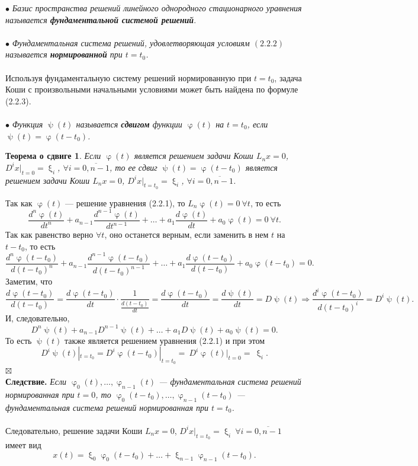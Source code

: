 \documentclass[a4paper, 12pt]{report}
\newenvironment{Proof} %
{\par\noindent{$\blacklozenge$}} %
{\hfill$\scriptstyle\boxtimes$}
\renewcommand{\varphi}{\upvarphi}
\renewcommand{\psi}{\uppsi}
\renewcommand{\xi}{\upxi}
\begin{document}
	$\bullet$ \textit{Базис пространства решений линейного однородного стационарного уравнения называется \textbf{фундаментальной системой решений}}.\\\\
	$\bullet$ \textit{Фундаментальная система решений, удовлетворяющая условиям $(2.2.2)$ называется \textbf{нормированной} при $t = t_0$.}\\\\
	Используя фундаментальную систему решений нормированную при $t=t_0$, задача Коши с произвольными начальными условиями может быть найдена по формуле (2.2.3).\\\\
	$\bullet$ \textit{Функция $\psi(t)$ называется \textbf{сдвигом} функции $\varphi(t)$ на $t=t_0$, если $\psi(t) = \varphi(t-t_0)$.}
	\newtheorem*{2_2_4}{Теорема о сдвиге}\begin{2_2_4}
		Если $\varphi(t)$ является решением задачи Коши $L_nx = 0$, $D^ix|_{t=0} = \xi_i$, $\forall i = \overline{0,n-1}$, то ее сдвиг $\psi(t) = \varphi(t-t_0)$ является решением задачи Коши  $L_nx = 0$, $D^ix|_{t=t_0} = \xi_i$, $\forall i = \overline{0,n-1}$.
	\end{2_2_4}\begin{Proof}
		Так как $\varphi(t)$ --- решение уравнения (2.2.1), то $L_n\varphi(t) = 0\ \forall t$, то есть $$\dfrac{d^n\varphi(t)}{dt^n}+a_{n-1}\dfrac{d^{n-1}\varphi(t)}{dt^{n-1}} + \ldots + a_1\dfrac{d\varphi(t)}{dt} + a_0 \varphi(t) = 0\ \forall t.$$
		Так как равенство верно $\forall t$, оно останется верным, если заменить в нем $t$ на $t-t_0$, то есть
		$$\dfrac{d^n\varphi(t-t_0)}{d(t-t_0)^n}+a_{n-1}\dfrac{d^{n-1}\varphi(t-t_0)}{d(t-t_0)^{n-1}} + \ldots + a_1\dfrac{d\varphi(t-t_0)}{d(t-t_0)} + a_0 \varphi(t-t_0) = 0.$$ Заметим, что $$\dfrac{d\varphi(t-t_0)}{d(t-t_0)} = \dfrac{d\varphi(t-t_0)}{dt} \cdot \dfrac{1}{\frac{d(t-t_0)}{dt}} = \dfrac{d\varphi(t-t_0)}{dt} = \dfrac{d\psi(t)}{dt} = D\psi(t)\Rightarrow\dfrac{d^i\varphi(t-t_0)}{d(t-t_0)^i} = D^i\psi(t).$$ И, следовательно, $$D^n\psi(t) + a_{n-1}D^{n-1}\psi(t) + \ldots + a_1D\psi(t) + a_0\psi(t) = 0.$$ То есть $\psi(t)$ также является решением уравнения (2.2.1) и при этом $$D^i\psi(t)|_{t=t_0} = D^i\varphi(t-t_0)|_{t=t_0} =~D^i\varphi(t)|_{t=0} =~\xi_i.$$\end{Proof}\\
	\textbf{Следствие.} \textit{Если $\varphi_0(t),\ldots,\varphi_{n-1}(t)$ --- фундаментальная система решений нормированная при $t=0$, то $\varphi_0(t-t_0),\ldots,\varphi_{n-1}(t-t_0)$ --- фундаментальная система решений нормированная при $t=t_0$.}\\\\
	Следовательно, решение задачи Коши $L_nx = 0$, $D^ix|_{t=t_0} = \xi_i\ \forall i = \overline{0,n-1}$ имеет вид $$x(t) = \xi_0\varphi_0(t-t_0) + \ldots + \xi_{n-1}\varphi_{n-1}(t-t_0).$$
\end{document}
